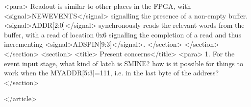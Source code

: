         <para> Readout is similar to other places in the FPGA, with
        <signal>NEWEVENTS</signal> signalling the presence of a
        non-empty buffer. <signal>ADDR[2:0]</signal> synchronously
        reads the relevant words from the buffer, with a read of
        location 0x6 signalling the completion of a read and thus
        incrementing <signal>ADSPIN[9:3]</signal>.  
      </section>
    </section>
  </section>
  <section>
    <title> Present concerns</title>
    <para> 1. For the event input stage, what kind of latch is SMINE? how is it possible for things to work when the MYADDR[5:3]=111, i.e.  in the last byte of the address? 
  </section>


</article>
        

